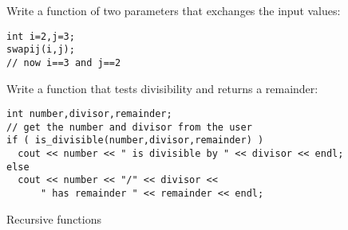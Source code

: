 \begin{exercise}
  \label{ex:swap}
  Write a function  of two parameters that exchanges the input values:
\begin{verbatim}
int i=2,j=3;
swapij(i,j);
// now i==3 and j==2
\end{verbatim}
\end{exercise}

\begin{exercise}
  \label{ex:div-remain}
  Write a function that tests divisibility and returns a remainder:

{\small
\begin{verbatim}
int number,divisor,remainder;
// get the number and divisor from the user
if ( is_divisible(number,divisor,remainder) )
  cout << number << " is divisible by " << divisor << endl;
else
  cout << number << "/" << divisor <<
      " has remainder " << remainder << endl;
\end{verbatim}
}
\end{exercise}

 {Recursive functions}
\label{sec:recursion}

